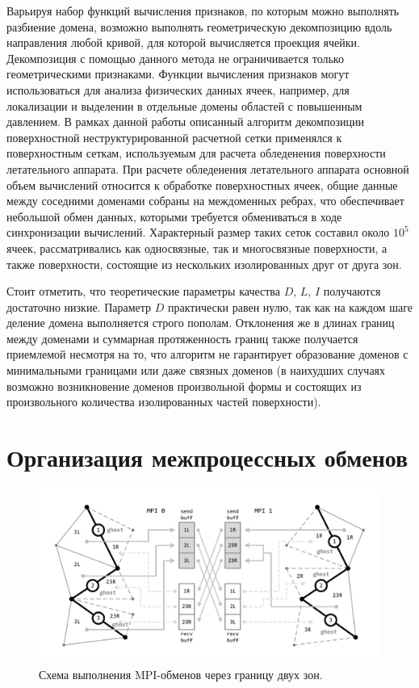 \documentclass[
11pt,%
tightenlines,%
twoside,%
onecolumn,%
nofloats,%
nobibnotes,%
nofootinbib,%
superscriptaddress,%
noshowpacs,%
centertags]%
{revtex4}
\begin{document}
Варьируя набор функций вычисления признаков, по которым можно выполнять разбиение домена, возможно выполнять геометрическую декомпозицию вдоль направления любой кривой, для которой вычисляется проекция ячейки.
Декомпозиция с помощью данного метода не ограничивается только геометрическими признаками.
Функции вычисления признаков могут использоваться для анализа физических данных ячеек, например, для локализации и выделении в отдельные домены областей с повышенным давлением.
В рамках данной работы описанный алгоритм декомпозиции поверхностной неструктурированной расчетной сетки применялся к поверхностным сеткам, используемым для расчета обледенения поверхности летательного аппарата.
При расчете обледенения летательного аппарата основной объем вычислений относится к обработке поверхностных ячеек, общие данные между соседними доменами собраны на междоменных ребрах, что обеспечивает небольшой обмен данных, которыми требуется обмениваться в ходе синхронизации вычислений.
Характерный размер таких сеток составил около $10^5$ ячеек, рассматривались как односвязные, так и многосвязные поверхности, а также поверхности, состоящие из нескольких изолированных друг от друга зон.

Стоит отметить, что теоретические параметры качества $D$, $L$, $I$ получаются достаточно низкие.
Параметр $D$ практически равен нулю, так как на каждом шаге деление домена выполняется строго пополам.
Отклонения же в длинах границ между доменами и суммарная протяженность границ также получается приемлемой несмотря на то, что алгоритм не гарантирует образование доменов с минимальными границами или даже связных доменов (в наихудших случаях возможно возникновение доменов произвольной формы и состоящих из произвольного количества изолированных частей поверхности).

\section{Организация межпроцессных обменов}

\begin{figure}[h]
\includegraphics[width=1.0\textwidth]{pics/04-MPI.pdf}
\caption{Схема выполнения MPI-обменов через границу двух зон.}\label{fig:04-MPI}
\end{figure}
\end{document}
